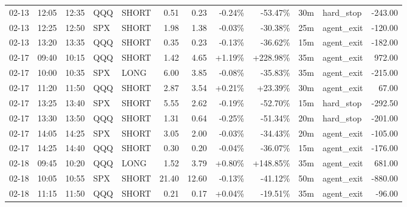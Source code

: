\documentclass[11pt,a4paper,twoside]{article}
\begin{document}
\begin{center}
\begin{longtable}{>{\color{txtmain}}l l l l l r r r r r >{\color{txtmain}}l r}
02-13 & 12:05 & 12:35 & QQQ & SHORT & 0.51 & 0.23 & \textcolor{lossred}{-0.24\%} & \textcolor{lossred}{-53.47\%} & 30m & hard\_stop & \textcolor{lossred}{-243.00} \\
02-13 & 12:25 & 12:50 & SPX & SHORT & 1.98 & 1.38 & \textcolor{lossred}{-0.03\%} & \textcolor{lossred}{-30.38\%} & 25m & agent\_exit & \textcolor{lossred}{-120.00} \\
02-13 & 13:20 & 13:35 & QQQ & SHORT & 0.35 & 0.23 & \textcolor{lossred}{-0.13\%} & \textcolor{lossred}{-36.62\%} & 15m & agent\_exit & \textcolor{lossred}{-182.00} \\
02-17 & 09:40 & 10:15 & QQQ & SHORT & 1.42 & 4.65 & \textcolor{wingreen}{+1.19\%} & \textcolor{wingreen}{+228.98\%} & 35m & agent\_exit & \textcolor{wingreen}{972.00} \\
02-17 & 10:00 & 10:35 & SPX & LONG & 6.00 & 3.85 & \textcolor{lossred}{-0.08\%} & \textcolor{lossred}{-35.83\%} & 35m & agent\_exit & \textcolor{lossred}{-215.00} \\
02-17 & 11:20 & 11:50 & QQQ & SHORT & 2.87 & 3.54 & \textcolor{wingreen}{+0.21\%} & \textcolor{wingreen}{+23.39\%} & 30m & agent\_exit & \textcolor{wingreen}{67.00} \\
02-17 & 13:25 & 13:40 & SPX & SHORT & 5.55 & 2.62 & \textcolor{lossred}{-0.19\%} & \textcolor{lossred}{-52.70\%} & 15m & hard\_stop & \textcolor{lossred}{-292.50} \\
02-17 & 13:30 & 13:50 & QQQ & SHORT & 1.31 & 0.64 & \textcolor{lossred}{-0.25\%} & \textcolor{lossred}{-51.34\%} & 20m & hard\_stop & \textcolor{lossred}{-201.00} \\
02-17 & 14:05 & 14:25 & SPX & SHORT & 3.05 & 2.00 & \textcolor{lossred}{-0.03\%} & \textcolor{lossred}{-34.43\%} & 20m & agent\_exit & \textcolor{lossred}{-105.00} \\
02-17 & 14:25 & 14:40 & QQQ & SHORT & 0.30 & 0.20 & \textcolor{lossred}{-0.04\%} & \textcolor{lossred}{-36.07\%} & 15m & agent\_exit & \textcolor{lossred}{-176.00} \\
02-18 & 09:45 & 10:20 & QQQ & LONG & 1.52 & 3.79 & \textcolor{wingreen}{+0.80\%} & \textcolor{wingreen}{+148.85\%} & 35m & agent\_exit & \textcolor{wingreen}{681.00} \\
02-18 & 10:05 & 10:55 & SPX & SHORT & 21.40 & 12.60 & \textcolor{lossred}{-0.13\%} & \textcolor{lossred}{-41.12\%} & 50m & agent\_exit & \textcolor{lossred}{-880.00} \\
02-18 & 11:15 & 11:50 & QQQ & SHORT & 0.21 & 0.17 & \textcolor{wingreen}{+0.04\%} & \textcolor{lossred}{-19.51\%} & 35m & agent\_exit & \textcolor{lossred}{-96.00} \\

\end{longtable}
\end{center}
\end{document}
